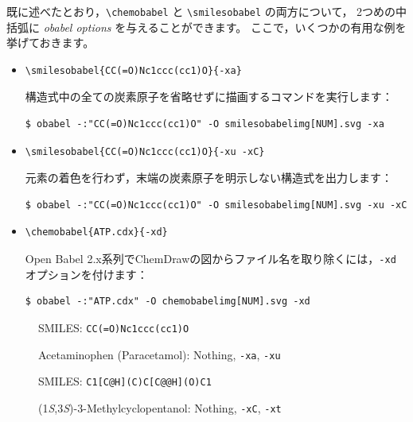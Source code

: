 \documentclass[12pt]{ltjsarticle}
\begin{document}
既に述べたとおり，\verb|\chemobabel| と \verb|\smilesobabel| の両方について，
2つめの中括弧に \textit{obabel options} を与えることができます。
ここで，いくつかの有用な例を挙げておきます。
\begin{itemize}
\item
\begin{verbatim}
\smilesobabel{CC(=O)Nc1ccc(cc1)O}{-xa}
\end{verbatim}
構造式中の全ての炭素原子を省略せずに描画するコマンドを実行します：
\begin{verbatim}
$ obabel -:"CC(=O)Nc1ccc(cc1)O" -O smilesobabelimg[NUM].svg -xa
\end{verbatim}
\item
\begin{verbatim}
\smilesobabel{CC(=O)Nc1ccc(cc1)O}{-xu -xC}
\end{verbatim}
元素の着色を行わず，末端の炭素原子を明示しない構造式を出力します：
\begin{verbatim}
$ obabel -:"CC(=O)Nc1ccc(cc1)O" -O smilesobabelimg[NUM].svg -xu -xC
\end{verbatim}
\item
\begin{verbatim}
\chemobabel{ATP.cdx}{-xd}
\end{verbatim}
Open Babel 2.x系列でChemDrawの図からファイル名を取り除くには，\texttt{-xd} オプションを付けます：
\begin{verbatim}
$ obabel -:"ATP.cdx" -O chemobabelimg[NUM].svg -xd
\end{verbatim}
\end{itemize}

\begin{figure}[ht]
  \centering
   \hspace{1cm}
   \hspace{1cm}
  \caption{Acetaminophen (Paracetamol): Nothing, \texttt{-xa}, \texttt{-xu}}
  SMILES: \verb|CC(=O)Nc1ccc(cc1)O|
\end{figure}

\begin{figure}[ht]
  \centering
   \hspace{1cm}
   \hspace{1cm}
  \caption{(1\textit{S},3\textit{S})-3-Methylcyclopentanol: Nothing, \texttt{-xC}, \texttt{-xt}}
  SMILES: \verb|C1[C@H](C)C[C@@H](O)C1|
\end{figure}
\end{document}
